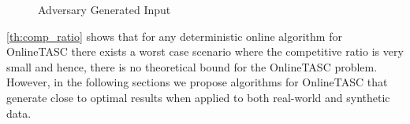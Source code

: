\begin{figure}[h]
    \centering
    \vspace{-0.15in}
    \caption{Adversary Generated Input}
    \label{fig:quality}
\end{figure}

\cref{th:comp_ratio} shows that for any deterministic online algorithm for OnlineTASC there exists a worst case scenario where the competitive ratio is very small and hence, there is no theoretical bound for the OnlineTASC problem. However, in the following sections we propose algorithms for OnlineTASC that generate close to optimal results when applied to both real-world and synthetic data.




